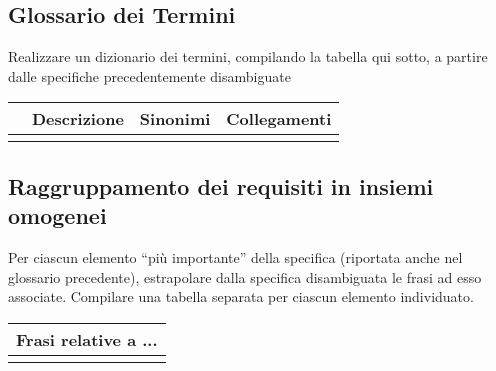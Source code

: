 \subsection*{Glossario dei Termini}

\begin{templateblock}
    Realizzare un dizionario dei termini, compilando la tabella qui sotto,
    a partire dalle specifiche precedentemente disambiguate
\end{templateblock}

\begin{tabularx}{\linewidth}{|X|X|X|X|}
    \hline
    \rowcolor{tblhdrcolor}
    \multicolumn{1}{|c|}{\textbf{Termine}}
     & \multicolumn{1}{|c|}{\textbf{Descrizione}}
     & \multicolumn{1}{|c|}{\textbf{Sinonimi}}
     & \multicolumn{1}{|c|}{\textbf{Collegamenti}}
    \\\hline
    \hfill
     & \hfill
     & \hfill
     & \hfill
    \\ \hline
\end{tabularx}

\subsection*{Raggruppamento dei requisiti in insiemi omogenei}

\begin{templateblock}
    Per ciascun elemento “più importante” della specifica
    (riportata anche nel glossario precedente), estrapolare dalla specifica
    disambiguata le frasi ad esso associate.
    Compilare una tabella separata per ciascun elemento individuato.
\end{templateblock}

\begin{tabularx}{\linewidth}{|X|}
    \hline
    \rowcolor{tblhdrcolor}
    \textbf{Frasi relative a ...} \\\hline
    \\ \hline
\end{tabularx}
